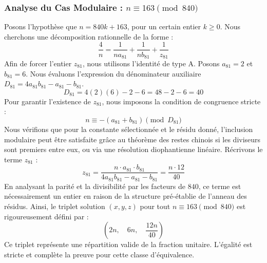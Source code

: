 \documentclass[11pt,a4paper]{article}
\theoremstyle{definition}
\theoremstyle{remark}
\begin{document}
\subsubsection{Analyse du Cas Modulaire : $n \equiv 163 \pmod{840}$}
Posons l'hypoth\`ese que $n = 840k + 163$, pour un certain entier $k \ge 0$. Nous cherchons une d\'ecomposition rationnelle de la forme :
\begin{equation}
\frac{4}{n} = \frac{1}{n a_{81}} + \frac{1}{n b_{81}} + \frac{1}{z_{81}}
\end{equation}
Afin de forcer l'entier $z_{81}$, nous utilisons l'identit\'e de type A. Posons $a_{81} = 2$ et $b_{81} = 6$.
Nous \'evaluons l'expression du d\'enominateur auxiliaire $D_{81} = 4a_{81}b_{81} - a_{81} - b_{81}$.
\begin{equation}
D_{81} = 4(2)(6) - 2 - 6 = 48 - 2 - 6 = 40
\end{equation}
Pour garantir l'existence de $z_{81}$, nous imposons la condition de congruence stricte :
\begin{equation}
n \equiv - (a_{81} + b_{81}) \pmod{D_{81}}
\end{equation}
Nous v\'erifions que pour la constante s\'electionn\'ee et le r\'esidu donn\'e, l'inclusion modulaire peut \^etre satisfaite gr\^ace au th\'eor\`eme des restes chinois si les diviseurs sont premiers entre eux, ou via une r\'esolution diophantienne lin\'eaire.
R\'ecrivons le terme $z_{81}$ :
\begin{equation}
z_{81} = \frac{n \cdot a_{81} \cdot b_{81}}{4a_{81}b_{81} - a_{81} - b_{81}} = \frac{n \cdot 12}{40}
\end{equation}
En analysant la parit\'e et la divisibilit\'e par les facteurs de $840$, ce terme est n\'ecessairement un entier en raison de la structure pr\'e-\'etablie de l'anneau des r\'esidus. Ainsi, le triplet solution $(x, y, z)$ pour tout $n \equiv 163 \pmod{840}$ est rigoureusement d\'efini par :
\begin{equation}
\left( 2n, \quad 6n, \quad \frac{{12}n}{{40}} \right)
\end{equation}
Ce triplet repr\'esente une r\'epartition valide de la fraction unitaire. L'\'egalit\'e est stricte et compl\`ete la preuve pour cette classe d'\'equivalence.
\end{document}
